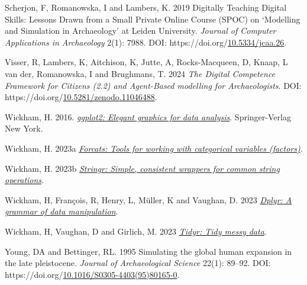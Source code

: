 \documentclass[
]{article}
\newlength{\cslhangindent}
\newlength{\cslentryspacingunit} %
\newenvironment{CSLReferences}[2] %
 {%
  \setlength{\parindent}{0pt}
  \ifodd #1
  \let\oldpar\par
  \def\par{\hangindent=\cslhangindent\oldpar}
  \fi
  \setlength{\parskip}{#2\cslentryspacingunit}
 }%
 {}
\begin{document}
\begin{CSLReferences}{1}{0}
\leavevmode{}%
Scherjon, F, Romanowska, I and Lambers, K. 2019 Digitally Teaching Digital Skills: Lessons Drawn from a Small Private Online Course (SPOC) on {`}Modelling and Simulation in Archaeology{'} at Leiden University. \emph{Journal of Computer Applications in Archaeology} 2(1): 7988. DOI: https://doi.org/\href{https://doi.org/10.5334/jcaa.26}{10.5334/jcaa.26}.

\leavevmode{}%
Visser, R, Lambers, K, Aitchison, K, Jutte, A, Rocks-Macqueen, D, Knaap, L van der, Romanowska, I and Brughmans, T. 2024 \emph{The Digital Competence Framework for Citizens (2.2) and Agent-Based modelling for Archaeologists}. DOI: https://doi.org/\href{https://doi.org/10.5281/zenodo.11046488}{10.5281/zenodo.11046488}.

\leavevmode{}%
Wickham, H. 2016. \emph{\href{http://ggplot2.org}{ggplot2: Elegant graphics for data analysis}}. Springer-Verlag New York.

\leavevmode{}%
Wickham, H. 2023a \emph{\href{https://forcats.tidyverse.org/}{Forcats: Tools for working with categorical variables (factors)}}.

\leavevmode{}%
Wickham, H. 2023b \emph{\href{https://stringr.tidyverse.org}{Stringr: Simple, consistent wrappers for common string operations}}.

\leavevmode{}%
Wickham, H, François, R, Henry, L, Müller, K and Vaughan, D. 2023 \emph{\href{https://dplyr.tidyverse.org}{Dplyr: A grammar of data manipulation}}.

\leavevmode{}%
Wickham, H, Vaughan, D and Girlich, M. 2023 \emph{\href{https://tidyr.tidyverse.org}{Tidyr: Tidy messy data}}.

\leavevmode{}%
Young, DA and Bettinger, RL. 1995 Simulating the global human expansion in the late pleistocene. \emph{Journal of Archaeological Science} 22(1): 89--92. DOI: https://doi.org/\href{https://doi.org/10.1016/S0305-4403(95)80165-0}{10.1016/S0305-4403(95)80165-0}.

\end{CSLReferences}
\end{document}
